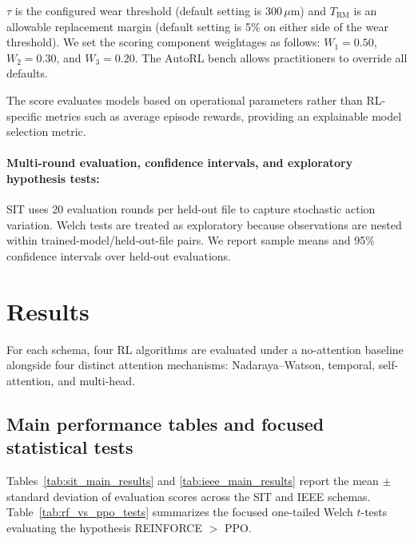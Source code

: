 \documentclass[sn-basic]{sn-jnl}%
\begin{document}
$\tau$ is the configured wear threshold (default setting is $300\,\mu\mathrm{m}$) and $T_{\mathrm{RM}}$ is an allowable replacement margin (default setting is 5\% on either side of the wear threshold). We set the scoring component weightages as follows: $W_1 = 0.50$, $W_2 = 0.30$, and $W_3 = 0.20$. The AutoRL bench allows practitioners to override all defaults.

The score evaluates models based on operational parameters rather than RL-specific metrics such as average episode rewards, providing an explainable model selection metric.

\paragraph{Multi-round evaluation, confidence intervals, and exploratory hypothesis tests:}
SIT uses 20 evaluation rounds per held-out file to capture stochastic action variation. Welch tests are treated as exploratory because observations are nested within trained-model/held-out-file pairs. We report sample means and 95\% confidence intervals over held-out evaluations.

\section{Results} \label{sec:results}
For each schema, four RL algorithms are evaluated under a no-attention baseline alongside four distinct attention mechanisms: Nadaraya--Watson, temporal, self-attention, and multi-head.

\subsection{Main performance tables and focused statistical tests}
\label{sec:hypothesis_tests}

Tables~\ref{tab:sit_main_results} and \ref{tab:ieee_main_results} report the mean $\pm$ standard deviation of evaluation scores across the SIT and IEEE schemas. Table~\ref{tab:rf_vs_ppo_tests} summarizes the focused one-tailed Welch $t$-tests evaluating the hypothesis \textsc{REINFORCE} $>$ \textsc{PPO}. 
\end{document}
